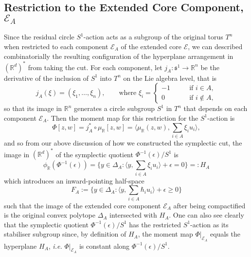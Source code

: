 \documentclass[11pt]{amsart}
\newcommand{\st}{\ensuremath{:}}%
\newcommand{\ie}{\emph{i.e.} }
\newcommand{\e}{\epsilon}
\newcommand{\RR}{\mathbb{R}}
\newcommand{\mc}[1]{\mathcal{#1}}
\newcommand{\mf}[1]{\mathfrak{#1}}
\newcommand{\mrr}{\mu_{\mathbb{R}}}
\newcommand{\prr}{\phi_{\mathbb{R}}}
\begin{document}
\subsection{Restriction to the Extended Core Component, $\mc{E}_{A}$}

Since the residual circle $S^{1}$-action acts as a subgroup of the original torus $T^{n}$ when restricted to each component $\mc{E}_{A}$ of the extended core $\mc{E}$, we can described combinatorially the resulting configuration of the hyperplane arrangement in $(\RR^{d})^{\ast}$ from taking the cut. For each component, let $j_{A}: \mf{s}^{1} \rightarrow \RR^{n}$ be the derivative of the inclusion of $S^{1}$ into $T^{n}$ on the Lie algebra level, that is
\begin{equation*}
	j_{A}( \xi  ) = (\xi_{1},\ldots, \xi_{n}),\qquad \text{where } \xi_{i} = 
	\begin{cases}
		-1\qquad&\text{if } i\in A,\\
		0\qquad &\text{if } i \not\in A,
	\end{cases}
\end{equation*}
so that its image in $\RR^{n}$ generates a circle subgroup $S^{1}$ in $T^{n}$ that depends on each component $\mc{E}_{A}$. Then the moment map for this restriction for the $S^{1}$-action is
\begin{equation*}
	\Phi[z,w] = j_{A}^{\ast} \circ \mrr[z,w] = \bigg\langle \mrr(z,w), \sum_{i\in A}\xi_{i} u_{i} \bigg\rangle,
\end{equation*}
and so from our above discussion of how we constructed the symplectic cut, the image in $(\RR^{d})^{\ast}$ of the symplectic quotient $\Phi^{-1}(\e)/S^{1}$ is
\begin{equation*}
	\prr(\Phi^{-1}(\e)) = \bigg\{ y \in \Delta_{A} \st \bigg\langle y, \sum_{i\in A}\xi_{i}u_{i}\bigg\rangle + \e = 0 \bigg\} =: H_{A}
\end{equation*}
which introduces an inward-pointing half-space
\begin{equation*}
	F_{A} := \bigg\{ y \in \Delta_{A} \st \bigg\langle y, \sum_{i\in A}\hbar_{i}u_{i}\bigg\rangle + \e \geq 0 \bigg\}
\end{equation*}
such that the image of the extended core component $\mc{E}_{A}$ after being compactified is the original convex polytope $\Delta_{A}$ intersected with $H_{A}$. One can also see clearly that the symplectic quotient $\Phi^{-1}(\e)/S^{1}$ has the restricted $S^{1}$-action as its stabiliser subgroup since, by definition of $H_{A}$, the moment map $\Phi|_{\mc{E}_{A}}$ equals the hyperplane $H_{A}$, \ie $\Phi|_{\mc{E}_{A}}$ is constant along $\Phi^{-1}(\epsilon)/S^{1}$.
\end{document}
